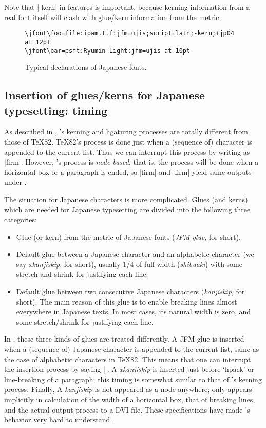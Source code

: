 \documentclass{ajt}
\begin{document}
Note that |-kern| in features
is important, because kerning information from a real font itself will
clash with glue/kern information from the metric.

\begin{figure}
\begin{verbatim}
\jfont\foo=file:ipam.ttf:jfm=ujis;script=latn;-kern;+jp04 at 12pt
\jfont\bar=psft:Ryumin-Light:jfm=ujis at 10pt
\end{verbatim}
\caption{Typical declarations of Japanese fonts.}
\label{fig-jfdef}
\end{figure}

\subsection{Insertion of glues/kerns for Japanese typesetting: timing}
\label{ssec-jglue}

As described in \cite{luatexref}, \LuaTeX's kerning and ligaturing
processes are totally different from those of \TeX82.  \TeX82's process is
done just when a (sequence of) character is appended to the current
list. Thus we can interrupt this process by writing as
|f{}irm|. However, \LuaTeX's process is \emph{node-based}, that is, the
process will be done when a horizontal box or a paragraph is ended, so
|f{}irm| and |firm| yield  same outputs under \LuaTeX.

The situation for Japanese characters is more complicated.
Glues (and kerns) which are needed for Japanese
typesetting are divided into the following three categories:
\begin{itemize}
\item Glue (or kern) from the metric of Japanese fonts (\emph{JFM glue},
      for short). 

\item Default glue between a Japanese character and an alphabetic
      character (we say \emph{xkanjiskip}, for short), usually 1/4 of
      full-width (\emph{shibuaki}) with some stretch and shrink for
      justifying each line.
\item Default glue between two consecutive Japanese characters
      (\emph{kanjiskip}, for short). The main reason of this glue is to
      enable breaking lines almost everywhere in Japanese texts. In most
      cases, its natural width is zero, and some stretch/shrink for
      justifying each line.
\end{itemize}
In \pTeX, these three kinds of glues are treated differently. A JFM glue
is inserted when a (sequence of) Japanese character is appended to the
current list, same as the case of alphabetic characters in \TeX82. This
means that one can interrupt the insertion process by saying |{}|.  A
\emph{xkanjiskip} is inserted just before `hpack' or line-breaking of a
paragraph; this timing is somewhat similar to that of \LuaTeX's kerning
process. Finally, A \emph{kanjiskip} is not appeared as a node anywhere;
only appears implicitly in calculation of the width of a horizontal box,
that of breaking lines, and the actual output process to a DVI
file. These specifications have made \pTeX's behavior very hard to
understand.
\end{document}
